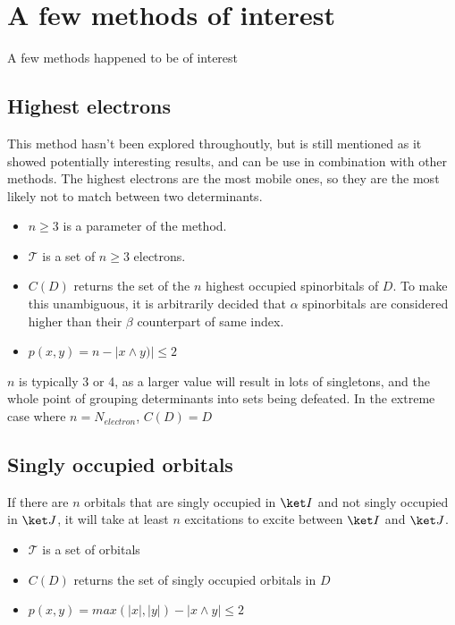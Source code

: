 \section{A few methods of interest}

A few methods happened to be of interest
\subsection{Highest electrons}
This method hasn't been explored throughoutly, but is still mentioned as it showed potentially interesting results, and can be use in combination with other methods.
The highest electrons are the most mobile ones, so they are the most likely not to match between two determinants. 

\begin{itemize}
	\item
$n \geq 3$ is a parameter of the method. 
	\item
$\mathcal{T}$ is a set of $n \geq 3$ electrons. 
	\item
$C(D)$ returns the set of the $n$ highest occupied spinorbitals of $D$. To make this unambiguous, it is arbitrarily decided that $\alpha$ spinorbitals are considered higher than their $\beta$ counterpart of same index.
	\item
$p(x, y) = n - |x \wedge y)| \leq 2$
\end{itemize}

$n$ is typically 3 or 4, as a larger value will result in lots of singletons, and the whole point of grouping determinants into sets being defeated. In the extreme case where $n = N_{electron}$, $C(D) = D$
   


\subsection{Singly occupied orbitals}
If there are $n$ orbitals that are singly occupied in $\ket I$ and not singly occupied in $\ket J$, it will take at least $n$ excitations to excite between $\ket I$ and $\ket J$.

\begin{itemize}
	\item
$\mathcal{T}$ is a set of orbitals
	\item
$C(D)$ returns the set of singly occupied orbitals in $D$
	\item
$p(x, y) = max (|x|, |y|) - |x \wedge y| \leq 2$
\end{itemize}

